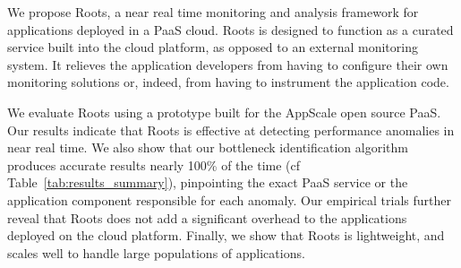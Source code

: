 We propose Roots, a near real time monitoring and analysis
framework for applications deployed in a PaaS cloud. 
Roots is designed to function as a curated service
built into the cloud platform, as opposed to an external monitoring system. 
It relieves the application developers from having to configure
their own monitoring solutions or, indeed,
from having to instrument the application code.


We evaluate Roots using a prototype built for the AppScale open source PaaS. 
Our results indicate that Roots is effective at detecting performance anomalies
in near real time. We also show that our bottleneck identification algorithm
produces accurate results nearly 100\% of the time (cf
Table~\ref{tab:results_summary}), pinpointing the exact PaaS
service or the application component responsible for each anomaly. Our empirical trials further 
reveal that Roots does not add a significant overhead to the applications deployed
on the cloud platform. Finally, we show that Roots is lightweight, 
and scales well to handle large populations of applications. 

